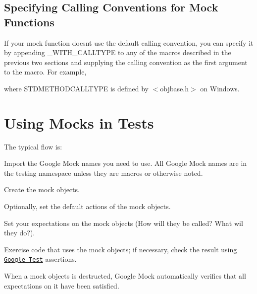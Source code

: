 \subsection*{Specifying Calling Conventions for Mock Functions}

If your mock function doesn\textquotesingle{}t use the default calling convention, you can specify it by appending {\ttfamily \+\_\+\+W\+I\+T\+H\+\_\+\+C\+A\+L\+L\+T\+Y\+PE} to any of the macros described in the previous two sections and supplying the calling convention as the first argument to the macro. For example, 
\begin{DoxyCode}{0}
\end{DoxyCode}
 where {\ttfamily S\+T\+D\+M\+E\+T\+H\+O\+D\+C\+A\+L\+L\+T\+Y\+PE} is defined by {\ttfamily $<$objbase.\+h$>$} on Windows.

\section*{Using Mocks in Tests}

The typical flow is\+:
\begin{DoxyEnumerate}
\item Import the Google Mock names you need to use. All Google Mock names are in the {\ttfamily testing} namespace unless they are macros or otherwise noted.
\end{DoxyEnumerate}
\begin{DoxyEnumerate}
\item Create the mock objects.
\end{DoxyEnumerate}
\begin{DoxyEnumerate}
\item Optionally, set the default actions of the mock objects.
\end{DoxyEnumerate}
\begin{DoxyEnumerate}
\item Set your expectations on the mock objects (How will they be called? What wil they do?).
\end{DoxyEnumerate}
\begin{DoxyEnumerate}
\item Exercise code that uses the mock objects; if necessary, check the result using \href{../../googletest/}{\tt Google Test} assertions.
\end{DoxyEnumerate}
\begin{DoxyEnumerate}
\item When a mock objects is destructed, Google Mock automatically verifies that all expectations on it have been satisfied.
\end{DoxyEnumerate}

